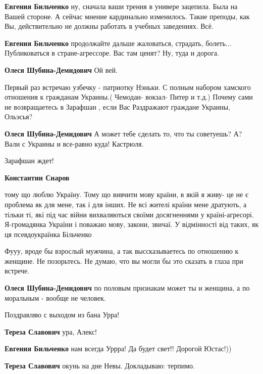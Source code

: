 \begin{itemize}
\begin{itemize}
\textbf{Евгения Бильченко} ну, сначала ваши трения в универе зацепила. Была на Вашей стороне. А сейчас мнение кардинально изменилось. Такие преподы, как Вы, действительно не должны работать в учебных заведениях. Всё.

\textbf{Евгения Бильченко} продолжайте дальше жаловаться, страдать, болеть... Публиковаться в стране-агрессоре. Вас там ценят? Ну, туда и дорога.

\textbf{Олеся Шубина-Демидович} Ой вей.


Первый раз встречаю узбечку - патриотку Нэньки. С полным набором хамского
отношения к гражданам Украины.( Чемодан- вокзал- Питер и т.д.) Почему сами не
возвращаетесь в Зарафшан , если Вас Раздражают граждане Украины, Ольэсья?

\textbf{Олеся Шубина-Демидович} А может тебе сделать то, что ты советуешь? А? Вали с Украины и все-равно куда! Кастрюля.

Зарафшан ждет!

\textbf{Константин Снаров} 

тому що люблю Україну. Тому що вивчити мову країни, в якій я живу- це не є
проблема як для мене, так і для інших. Не всі жителі країни мене дратують, а
тільки ті, які під час війни вихваляються своїми досягненнями у
країні-агресорі. Я-громадянка України і поважаю мову, закони, звичаї. У
відмінності від таких, як ця псевдоукраїнка Більченко



Фууу, вроде бы взрослый мужчина, а так выссказываетесь по отношению к женщине.
Не позорьтесь. Не думаю, что вы могли бы это сказать в глаза при встрече.

\textbf{Олеся Шубина-Демидович} по половым признакам может ты и женщина, а по моральным - вообще не человек.
\end{itemize} %

Поздравляю с выходом из бана Урра!

\begin{itemize} %
\textbf{Тереза Славович} ура, Алекс!

\textbf{Евгения Бильченко} нам всегда Уррра! Да будет свет!! Дорогой Юстас!))

\textbf{Тереза Славович} окунь на дне Невы. Докладываю: терпимо.


\end{itemize}
\end{itemize}
